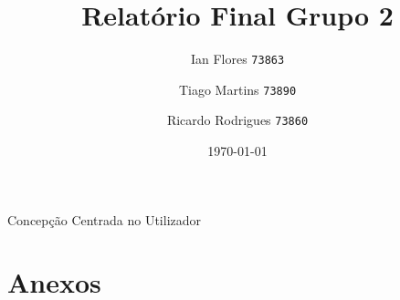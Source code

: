\documentclass{report}
\title{Relatório Final Grupo 2}
\author{
Ian Flores \texttt{73863}
\and
Tiago Martins \texttt{73890}
\and
Ricardo Rodrigues \texttt{73860}
}
\date{\today}
\begin{document}
\begin{acronym}
	 {Concepção Centrada no Utilizador}
\end{acronym}

\maketitle

\tableofcontents







%













\chapter{Anexos}




\end{document}
